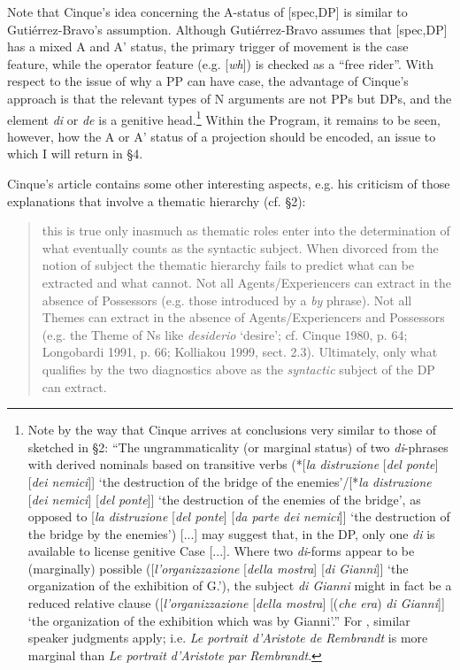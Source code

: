 \documentclass[output=paper]{langsci/langscibook}
\begin{document}
Note that Cinque’s idea concerning the A-status of [spec,DP] is similar to Gutiérrez-Bravo’s assumption. Although Gutiérrez-Bravo assumes that [spec,DP] has a mixed A and A’ status, the primary trigger of movement is the case feature, while the operator feature (e.g. [\textit{wh}]) is checked as a “free rider”. With respect to the issue of why a PP can have case, the advantage of Cinque’s approach is that the relevant types of N arguments are not PPs but DPs, and the element \textit{di} or  \textit{de} is a genitive head.\footnote{Note by the way that Cinque arrives at conclusions very similar to those of \citet{Kolliakou1999} sketched in §2: “The ungrammaticality (or marginal status) of two \textit{di}{}-phrases with derived nominals based on transitive verbs (*[\textit{la distruzione} [\textit{del ponte}] [\textit{dei nemici}]] ‘the destruction of the bridge of the enemies’/[*\textit{la distruzione} [\textit{dei nemici}] [\textit{del ponte}]] ‘the destruction of the enemies of the bridge’, as opposed to [\textit{la distruzione} [\textit{del ponte}] [\textit{da parte dei nemici}]] ‘the destruction of the bridge by the enemies’) [...] may suggest that, in the  DP, only one \textit{di} is available to license genitive Case [...]. Where two \textit{di}-forms appear to be (marginally) possible ([\textit{l’organizzazione} [\textit{della mostra}] [\textit{di Gianni}]] ‘the organization of the exhibition of G.’), the subject \textit{di Gianni} might in fact be a reduced relative clause ([\textit{l’organizzazione} [\textit{della mostra}] [(\textit{che era}) \textit{di Gianni}]] ‘the organization of the exhibition which was by Gianni’.” For , similar speaker judgments apply; i.e. \textit{Le portrait d’Aristote de Rembrandt} is more marginal than \textit{Le portrait d’Aristote par Rembrandt}.} Within the  Program, it remains to be seen, however, how the A or A’ status of a projection should be encoded, an issue to which I will return in §4.

Cinque’s article contains some other interesting aspects, e.g. his criticism of those explanations that involve a thematic hierarchy (cf. §2):

\begin{quote}\relax [...] this is true only inasmuch as thematic roles enter into the determination of what eventually counts as the syntactic subject. When divorced from the notion of subject the thematic hierarchy fails to predict what can be extracted and what cannot. Not all Agents/Experiencers can extract in the absence of Possessors (e.g. those introduced by a \textit{by} phrase). Not all Themes can extract in the absence of Agents/Experiencers and Possessors (e.g. the Theme of Ns like \textit{desiderio} ‘desire’; cf. Cinque 1980, p. 64; Longobardi 1991, p. 66; Kolliakou 1999, sect. 2.3). Ultimately, only what qualifies by the two diagnostics above as the \textit{syntactic} subject of the DP can extract.\\\hbox{}\hfill{\citep[95–96, Footnote 1]{Cinque2014}}\end{quote}
\end{document}

